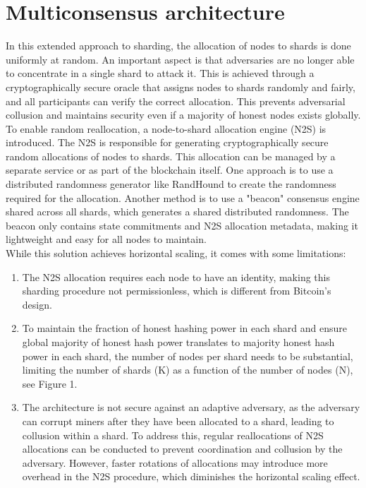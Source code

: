 \section{Multiconsensus architecture} 
In this extended approach to sharding, the allocation of nodes to shards is done uniformly at random. An important aspect is that adversaries are no longer able to concentrate in a single shard to attack it. This is achieved through a cryptographically secure oracle that assigns nodes to shards randomly and fairly, and all participants can verify the correct allocation. This prevents adversarial collusion and maintains security even if a majority of honest nodes exists globally.\\
To enable random reallocation, a node-to-shard allocation engine (N2S) is introduced. The N2S is responsible for generating cryptographically secure random allocations of nodes to shards. This allocation can be managed by a separate service or as part of the blockchain itself. One approach is to use a distributed randomness generator like RandHound to create the randomness required for the allocation. Another method is to use a "beacon" consensus engine shared across all shards, which generates a shared distributed randomness. The beacon only contains state commitments and N2S allocation metadata, making it lightweight and easy for all nodes to maintain.\\
While this solution achieves horizontal scaling, it comes with some limitations:
\begin{enumerate}
	\item The N2S allocation requires each node to have an identity, making this sharding procedure not permissionless, which is different from Bitcoin's design.
	\item To maintain the fraction of honest hashing power in each shard and ensure global majority of honest hash power translates to majority honest hash power in each shard, the number of nodes per shard needs to be substantial, limiting the number of shards (K) as a function of the number of nodes (N), see Figure 1.
	\item The architecture is not secure against an adaptive adversary, as the adversary can corrupt miners after they have been allocated to a shard, leading to collusion within a shard. To address this, regular reallocations of N2S allocations can be conducted to prevent coordination and collusion by the adversary. However, faster rotations of allocations may introduce more overhead in the N2S procedure, which diminishes the horizontal scaling effect.
\end{enumerate}
